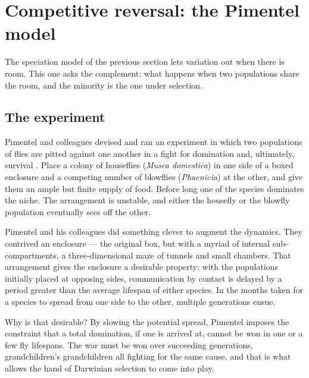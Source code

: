 
\section{Competitive reversal: the Pimentel model}
\label{var:sec:pimentel}

The speciation model of the previous section lets variation out when there
is room. This one asks the complement: what happens when two populations
share the room, and the minority is the one under selection.

\subsection{The experiment}
\label{var:sec:pimentelexperiment}

Pimentel and colleagues devised and ran an experiment in which two
populations of flies are pitted against one another in a fight for domination
and, ultimately, survival \cite{pimentel1965selection,hutchingson2018ecological}.
Place a colony of houseflies (\textit{Musca domestica}) in one side of a
boxed enclosure and a competing number of blowflies (\textit{Phaenicia}) at
the other, and give them an ample but finite supply of food. Before long one
of the species dominates the niche. The arrangement is unstable, and either
the housefly or the blowfly population eventually sees off the other.

Pimentel and his colleagues did something clever to augment the dynamics.
They contrived an enclosure --- the original box, but with a myriad of
internal sub-compartments, a three-dimensional maze of tunnels and small
chambers. That arrangement gives the enclosure a desirable property: with the
populations initially placed at opposing sides, communication by contact is
delayed by a period greater than the average lifespan of either species. In
the months taken for a species to spread from one side to the other, multiple
generations ensue.

Why is that desirable? By slowing the potential spread, Pimentel imposes the
constraint that a total domination, if one is arrived at, cannot be won in
one or a few fly lifespans. The war must be won over succeeding generations,
grandchildren's grandchildren all fighting for the same cause, and that is
what allows the hand of Darwinian selection to come into play.

